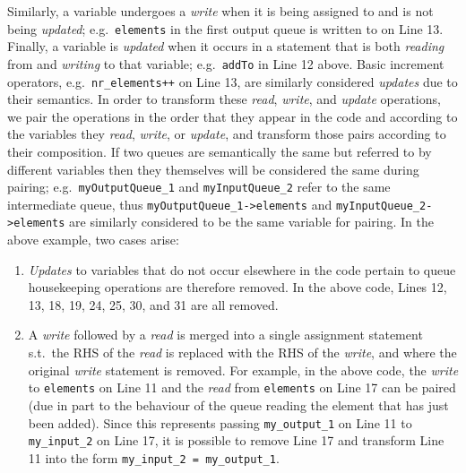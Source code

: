 %
Similarly, a variable undergoes a \emph{write} when it is being assigned to and is not being \emph{updated}; e.g.\ \lstinline|elements|
in the first output queue is written to on Line 13.
%
Finally, a variable is \emph{updated} when it occurs in a statement that is both \emph{reading} from and \emph{writing} to that variable; e.g.\  \lstinline|addTo| in Line 12 above. Basic increment operators, e.g.\  \lstinline|nr_elements++| on Line 13, are similarly considered \emph{updates} due to their semantics.
%
%
In order to transform these \emph{read}, \emph{write}, and \emph{update} operations, we pair the operations in the order that they appear in the code and according to the variables they \emph{read}, \emph{write}, or \emph{update}, and transform those pairs according to their composition.
%
If two queues are semantically the same but referred to by different variables then they themselves will be considered the same during pairing; e.g.\ \lstinline|myOutputQueue_1| and \lstinline|myInputQueue_2| refer to the same intermediate queue, thus \lstinline|myOutputQueue_1->elements| and \lstinline|myInputQueue_2->elements| are similarly considered to be the same variable for pairing.
%
In the above example, two cases arise:
%
\begin{enumerate}
\item \emph{Updates} to variables that do not occur elsewhere in the code pertain to queue housekeeping operations are therefore removed.
%
In the above code, Lines 12, 13, 18, 19, 24, 25, 30, and 31 are all removed.


\item A \emph{write} followed by a \emph{read} is merged into a single assignment statement s.t.\ the RHS of the \emph{read} is replaced with the RHS of the \emph{write}, and where the original \emph{write} statement is removed.
%
For example, in the above code, the \emph{write} to \lstinline|elements| on Line 11 and the \emph{read} from \lstinline|elements| on Line 17 can be paired (due in part to the behaviour of the queue reading the element that has just been added). Since this represents passing \lstinline|my_output_1| on Line 11 to \lstinline|my_input_2| on Line 17, it is possible to remove Line 17 and transform Line 11 into the form \lstinline|my_input_2 = my_output_1|.
%
\end{enumerate}
